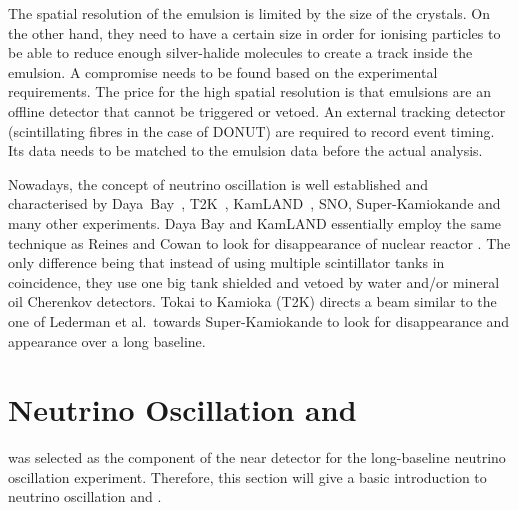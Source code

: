 The spatial resolution of the emulsion is limited by the size of the crystals.
On the other hand, they need to have a certain size in order for ionising particles to be able to reduce enough silver-halide molecules to create a track inside the emulsion.
A compromise needs to be found based on the experimental requirements.
The price for the high spatial resolution is that emulsions are an offline detector that cannot be triggered or vetoed.
An external tracking detector (scintillating fibres in the case of DONUT) are required to record event timing.
Its data needs to be matched to the emulsion data before the actual analysis.

Nowadays, the concept of neutrino oscillation is well established and characterised by Daya~Bay~\cite{dayabayRecent}, T2K~\cite{t2kOsc}, KamLAND~\cite{kamland}, SNO, Super-Kamiokande and many other experiments.
Daya Bay and KamLAND essentially employ the same technique as Reines and Cowan to look for disappearance of nuclear reactor \Pagne.
The only difference being that instead of using multiple scintillator tanks in coincidence, they use one big tank shielded and vetoed by water and/or mineral oil Cherenkov detectors.
Tokai to Kamioka (T2K) directs a \Pgngm beam similar to the one of Lederman et al.\ towards Super-Kamiokande to look for \Pgngm disappearance and \Pgne appearance over a long baseline.


\section{Neutrino Oscillation and \dune{}}
\label{sec:nu-detection_future-exp}


\AC{} was selected as the \lar{} component of the near detector for the \dune{} long-baseline neutrino oscillation experiment.
Therefore, this section will give a basic introduction to neutrino oscillation and \dune{}.

